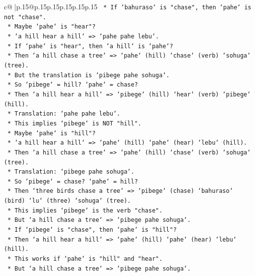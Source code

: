 \documentclass{article}
\begin{document}
{\begin{supertabular}{c@{$\;$}|p{.15\linewidth}@{}p{.15\linewidth}p{.15\linewidth}p{.15\linewidth}p{.15\linewidth}p{.15\linewidth}}
{{{\texttt{            *   If `bahuraso` is "chase", then `pahe` is not "chase".} \\
\texttt{            *   Maybe `pahe` is "hear"?} \\
\texttt{            *   `a hill hear a hill` => `pahe pahe lebu`.} \\
\texttt{            *   If `pahe` is "hear", then `a hill` is `pahe`?} \\
\texttt{            *   Then `a hill chase a tree` => `pahe` (hill) `chase` (verb) `sohuga` (tree).} \\
\texttt{            *   But the translation is `pibege pahe sohuga`.} \\
\texttt{            *   So `pibege` = hill? `pahe` = chase?} \\
\texttt{            *   Then `a hill hear a hill` => `pibege` (hill) `hear` (verb) `pibege` (hill).} \\
\texttt{            *   Translation: `pahe pahe lebu`.} \\
\texttt{            *   This implies `pibege` is NOT "hill".} \\
\texttt{            *   Maybe `pahe` is "hill"?} \\
\texttt{            *   `a hill hear a hill` => `pahe` (hill) `pahe` (hear) `lebu` (hill).} \\
\texttt{            *   Then `a hill chase a tree` => `pahe` (hill) `chase` (verb) `sohuga` (tree).} \\
\texttt{            *   Translation: `pibege pahe sohuga`.} \\
\texttt{            *   So `pibege` = chase? `pahe` = hill?} \\
\texttt{            *   Then `three birds chase a tree` => `pibege` (chase) `bahuraso` (bird) `lu` (three) `sohuga` (tree).} \\
\texttt{            *   This implies `pibege` is the verb "chase".} \\
\texttt{            *   But `a hill chase a tree` => `pibege pahe sohuga`.} \\
\texttt{            *   If `pibege` is "chase", then `pahe` is "hill"?} \\
\texttt{            *   Then `a hill hear a hill` => `pahe` (hill) `pahe` (hear) `lebu` (hill).} \\
\texttt{            *   This works if `pahe` is "hill" and "hear".} \\
\texttt{            *   But `a hill chase a tree` => `pibege pahe sohuga`.} \\
}}}
\end{supertabular}}
\end{document}
